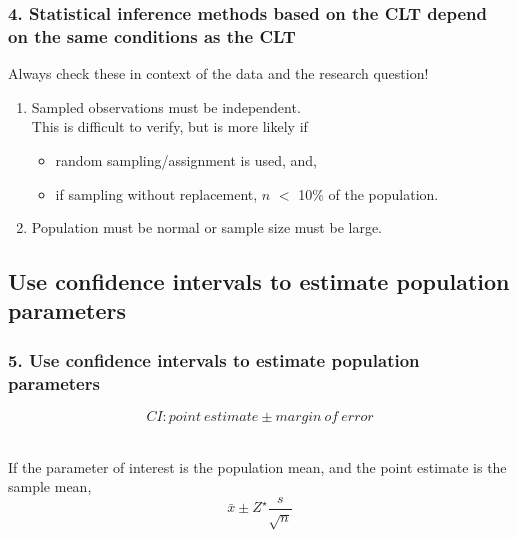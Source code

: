 \documentclass[slidestop,compress,mathserif,12pt,t,professionalfonts,xcolor=table]{beamer}
\begin{document}

\begin{frame}
\frametitle{4. Statistical inference methods based on the CLT depend on the same conditions as the CLT}

Always check these in context of the data and the research question!

\begin{enumerate}

\item {} Sampled observations must be independent.
$\:$ \\
This is difficult to verify, but is more likely if
\begin{itemize}
\item random sampling/assignment is used, and,
\item if sampling without replacement, $n$ $<$ 10\% of the population.
\end{itemize}

\item {} Population must be normal or sample size must be large.

\end{enumerate}

\end{frame}


\subsection{Use confidence intervals to estimate population parameters}
\label{mi5}


\begin{frame}
\frametitle{5. Use confidence intervals to estimate population parameters}

\vfill

\[ CI: point~estimate \pm margin~of~error \]
$\:$ \\

\pause

If the parameter of interest is the population mean, and the point estimate is the sample mean,
\[ \bar{x} \pm Z^\star \frac{s}{\sqrt{n}} \]

\vfill

\end{frame}

\end{document}
